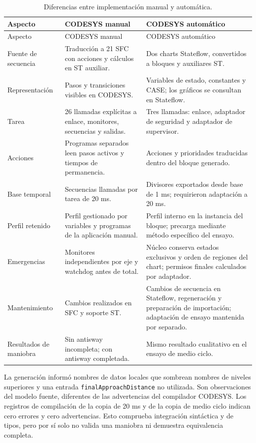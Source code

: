 \documentclass[a4paper,10pt,onecolumn,journal]{ieeeconf}
\numberwithin{equation}{section}
\begin{document}
{\footnotesize
\begin{longtable}{L{3.0cm} L{5.8cm} L{5.8cm}}
\caption{Diferencias entre implementación manual y automática.}\label{tab:manual_auto_st}\\
\toprule Aspecto & CODESYS manual & CODESYS automático\\\midrule
\endfirsthead
\toprule Aspecto & CODESYS manual & CODESYS automático\\\midrule
\endhead
Fuente de secuencia & Traducción a 21 SFC con acciones y cálculos en ST auxiliar. & Dos charts Stateflow, convertidos a bloques y auxiliares ST.\\
Representación & Pasos y transiciones visibles en CODESYS. & Variables de estado, constantes y CASE; los gráficos se consultan en Stateflow.\\
Tarea & 26 llamadas explícitas a enlace, monitores, secuencias y salidas. & Tres llamadas: enlace, adaptador de seguridad y adaptador de supervisor.\\
Acciones & Programas separados leen pasos activos y tiempos de permanencia. & Acciones y prioridades traducidas dentro del bloque generado.\\
Base temporal & Secuencias llamadas por tarea de 20 ms. & Divisores exportados desde base de 1 ms; requirieron adaptación a 20 ms.\\
Perfil retenido & Perfil gestionado por variables y programas de la aplicación manual. & Perfil interno en la instancia del bloque; precarga mediante método específico del ensayo.\\
Emergencias & Monitores independientes por eje y watchdog antes de total. & Núcleo conserva estados exclusivos y orden de regiones del chart; permisos finales calculados por adaptador.\\
Mantenimiento & Cambios realizados en SFC y soporte ST. & Cambios de secuencia en Stateflow, regeneración y preparación de importación; adaptación de ensayo mantenida por separado.\\
Resultados de maniobra & Sin antisway incompleta; con antisway completada. & Mismo resultado cualitativo en el ensayo de medio ciclo.\\
\bottomrule
\end{longtable}}

La generación informó nombres de datos locales que sombrean nombres de niveles superiores y una entrada \texttt{finalApproachDistance} no utilizada. Son observaciones del modelo fuente, diferentes de las advertencias del compilador CODESYS. Los registros de compilación de la copia de 20 ms y de la copia de medio ciclo indican cero errores y cero advertencias. Esto comprueba integración sintáctica y de tipos, pero por sí solo no valida una maniobra ni demuestra equivalencia completa.
\end{document}
